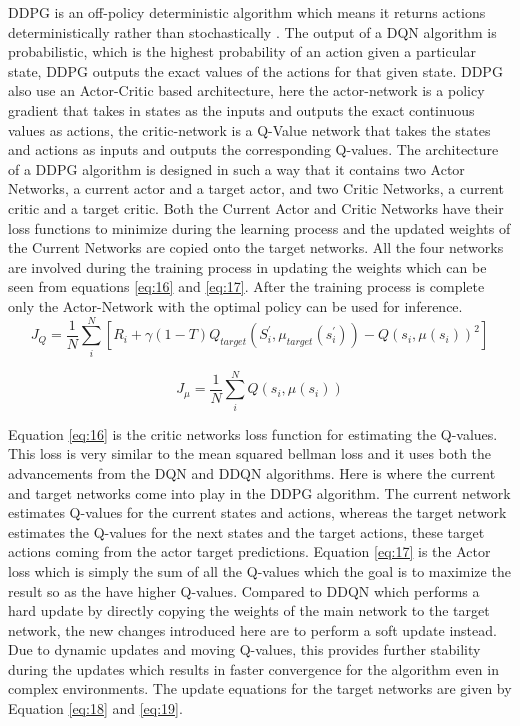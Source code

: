 DDPG is an off-policy deterministic algorithm which means it returns actions deterministically rather than stochastically \cite{haarnoja2018soft}. The output of a DQN algorithm is probabilistic, which is the highest probability of an action given a particular state, DDPG outputs the exact values of the actions for that given state. DDPG also use an Actor-Critic based architecture, here the actor-network is a policy gradient that takes in states as the inputs and outputs the exact continuous values as actions, the critic-network is a Q-Value network that takes the states and actions as inputs and outputs the corresponding Q-values. The architecture of a DDPG algorithm is designed in such a way that it contains two Actor Networks, a current actor and a target actor, and two Critic Networks, a current critic and a target critic. Both the Current Actor and Critic Networks have their loss functions to minimize during the learning process and the updated weights of the Current Networks are copied onto the target networks. All the four networks are involved during the training process in updating the weights which can be seen from equations \ref{eq:16} and \ref{eq:17}. After the training process is complete only the Actor-Network with the optimal policy can be used for inference. \\

\begin{equation}\label{eq:16}
    J_{Q} = \frac{1}{N} \sum_{i}^{N} [R_i + \gamma (1 - T) Q_{target} (S_{i}^{'}, \mu_{target} (s_{i}^{'})) - Q (s_i, \mu (s_{i}))^2 ]
\end{equation}

\begin{equation}\label{eq:17}
    J_\mu = \frac{1}{N} \sum_{i}^{N} Q(s_i, \mu(s_i ))
\end{equation}

Equation \ref{eq:16} is the critic networks loss function for estimating the Q-values. This loss is very similar to the mean squared bellman loss and it uses both the advancements from the DQN and DDQN algorithms. Here is where the current and target networks come into play in the DDPG algorithm. The current network estimates Q-values for the current states and actions, whereas the target network estimates the Q-values for the next states and the target actions, these target actions coming from the actor target predictions. Equation \ref{eq:17} is the Actor loss which is simply the sum of all the Q-values which the goal is to maximize the result so as the have higher Q-values. Compared to DDQN which performs a hard update by directly copying the weights of the main network to the target network, the new changes introduced here are to perform a soft update instead. Due to dynamic updates and moving Q-values, this provides further stability during the updates which results in faster convergence for the algorithm even in complex environments. The update equations for the target networks are given by Equation \ref{eq:18} and \ref{eq:19}. \\

